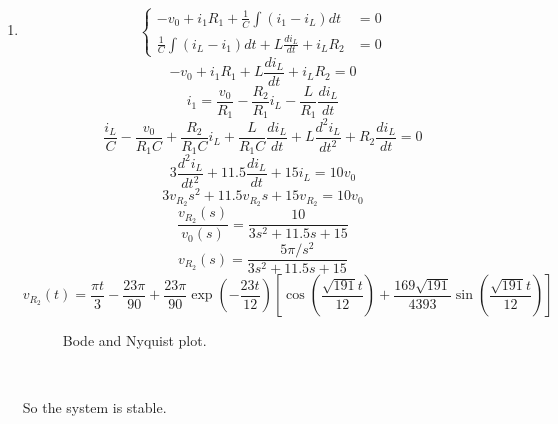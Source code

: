 \documentclass{article}
\newcommand{\inputmintedindent}[2]{
\begin{minipage}{0.1\linewidth}\end{minipage}
\begin{minipage}{0.85\linewidth}\inputminted{#1}{#2}\end{minipage}\\[0.5em]
}
\begin{document}
\begin{enumerate}
\item
$$\left\{\begin{aligned}
-v_0+i_1R_1+\frac{1}{C}\int(i_1-i_L)dt&=0\\
\frac{1}{C}\int(i_L-i_1)dt+L\frac{di_L}{dt}+i_LR_2&=0
\end{aligned}\right.$$
$$-v_0+i_1R_1+L\frac{di_L}{dt}+i_LR_2=0$$
$$i_1=\frac{v_0}{R_1}-\frac{R_2}{R_1}i_L-\frac{L}{R_1}\frac{di_L}{dt}$$
$$\frac{i_L}{C}-\frac{v_0}{R_1C}+\frac{R_2}{R_1C}i_L+\frac{L}{R_1C}\frac{di_L}{dt}+L\frac{d^2i_L}{dt^2}+R_2\frac{di_L}{dt}=0$$
$$3\frac{d^2i_L}{dt^2}+11.5\frac{di_L}{dt}+15i_L=10v_0$$
$$3v_{R_2}s^2+11.5v_{R_2}s+15v_{R_2}=10v_0$$
$$\frac{v_{R_2}(s)}{v_0(s)}=\frac{10}{3s^2+11.5s+15}$$
$$v_{R_2}(s)=\frac{5\pi/s^2}{3s^2+11.5s+15}$$
$$v_{R_2}(t)=\frac{\pi t}{3}-\frac{23\pi}{90}+\frac{23\pi}{90}\exp\left(-\frac{23t}{12}\right)\left[\cos\left(\frac{\sqrt{191}t}{12}\right)+\frac{169\sqrt{191}}{4393}\sin\left(\frac{\sqrt{191}t}{12}\right)\right]$$

\begin{figure}[!htbp]
	\centering
	\caption{Bode and Nyquist plot.}
\end{figure}

\inputmintedindent{matlab}{p2_2.m}

So the system is stable.

\end{enumerate}
\end{document}
